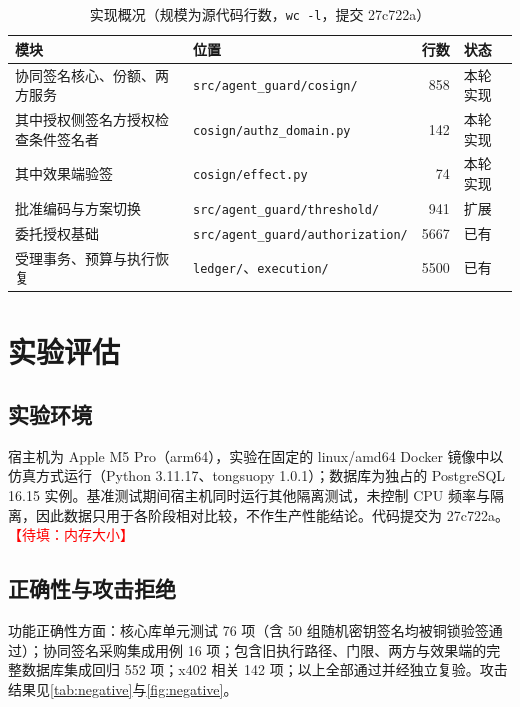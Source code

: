 \documentclass[UTF8,zihao=-4,a4paper]{ctexart}
\newif\ifshowguide
\newcommand{\guide}[1]{%
  \ifshowguide
  \begin{tcolorbox}[colback=gray!8,colframe=gray!45,boxrule=0.4pt,
      arc=1pt,left=4pt,right=4pt,top=2pt,bottom=2pt,fontupper=\small]
  \textbf{写作指引：}#1
  \end{tcolorbox}
  \fi}
\newcommand{\fillme}[1]{\textcolor{red}{【待填：#1】}}
\theoremstyle{plain}
\theoremstyle{definition}
\theoremstyle{remark}
\begin{document}
\begin{table}[htbp]
\centering
\caption{实现概况（规模为源代码行数，\texttt{wc -l}，提交 27c722a）}
\label{tab:impl}
\small
\begin{tabular}{@{}llrl@{}}
\toprule
模块 & 位置 & 行数 & 状态 \\
\midrule
协同签名核心、份额、两方服务 & \texttt{src/agent\_guard/cosign/} & 858 & 本轮实现 \\
\quad 其中授权侧签名方授权检查条件签名者 & \texttt{cosign/authz\_domain.py} & 142 & 本轮实现 \\
\quad 其中效果端验签 & \texttt{cosign/effect.py} & 74 & 本轮实现 \\
批准编码与方案切换 & \texttt{src/agent\_guard/threshold/} & 941 & 扩展 \\
委托授权基础 & \texttt{src/agent\_guard/authorization/} & 5667 & 已有 \\
受理事务、预算与执行恢复 & \texttt{ledger/}、\texttt{execution/} & 5500 & 已有 \\
\bottomrule
\end{tabular}
\end{table}

\section{实验评估}\label{sec:eval}

\guide{只报告实际跑出来的结果。小样本报告中位数和 p95，不报告“提升百分之多少”。历史证据、本轮真实运行和示意图分开呈现。}

\subsection{实验环境}
宿主机为 Apple M5 Pro（arm64），实验在固定的 linux/amd64 Docker 镜像中以仿真方式运行（Python 3.11.17、tongsuopy 1.0.1）；数据库为独占的 PostgreSQL 16.15 实例。基准测试期间宿主机同时运行其他隔离测试，未控制 CPU 频率与隔离，因此数据只用于各阶段相对比较，不作生产性能结论。代码提交为 27c722a。\fillme{内存大小}

\subsection{正确性与攻击拒绝}
功能正确性方面：核心库单元测试 76 项（含 50 组随机密钥签名均被铜锁验签通过）；协同签名采购集成用例 16 项；包含旧执行路径、门限、两方与效果端的完整数据库集成回归 552 项；x402 相关 142 项；以上全部通过并经独立复验。攻击结果见\cref{tab:negative}与\cref{fig:negative}。
\end{document}
